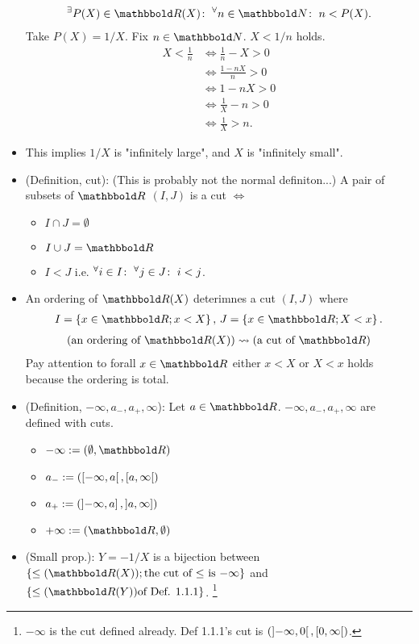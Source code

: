 \documentclass[9pt]{ltjsarticle}
\begin{document}
\begin{itemize}
  \begin{align}
    \Exists{P(X)\in \R (X)} \Forall{n\in \N} n < P(X).
  \end{align}
  \pf Take $P(X)=1/X$.  Fix $n\in \N$. $X<1/n$ holds.
  \begin{align}
    X < \frac{1}{n}
    &\iff
    \frac{1}{n}-X > 0 \\
    &\iff
    \frac{1-nX}{n}>0\\
    &\iff
    1-nX > 0\\
    &\iff
    \frac{1}{X}-n > 0\\
    &\iff
    \frac{1}{X} > n.
  \end{align}
  \item
  This implies $1/X$ is "infinitely large", and
  $X$ is "infinitely small".
  \item
  (Definition, cut):
  (This is probably not the normal definiton...)
  A pair of subsets of $\R$ $(I,J)$ is a cut $\iff$
  \begin{itemize}
    \item $I\cap J = \emptyset$
    \item $I\cup J = \R$
    \item $I < J$ i.e. ${}^{\forall}{i\in I}\mathrm{\colon\;}{}^{\forall}{j\in J}\mathrm{\colon\;} i < j$.
  \end{itemize}
  \item
  An ordering of $\R (X)$ deterimnes a cut $(I,J)$ where
  \begin{align}
    I=\set{x\in \R; x < X},\, J = \set{x\in \R; X < x}.
  \end{align}
  \begin{align}
    (\text{an ordering of $\R (X)$}) \squig
    (\text{a cut of $\R$})
  \end{align}
  Pay attention to forall $x\in \R$ either $x<X$ or $X<x$ holds because
  the ordering is total.
  \item
  (Definition, $-\infty,a_-,a_+,\infty$):
  Let $a\in \R$.
  $-\infty,a_-,a_+,\infty$ are defined with cuts.
  \begin{itemize}
    \item $-\infty \defeq \paren{\emptyset, \R}$
    \item $a_- := (\left[-\infty,a\right[,\left[a,\infty\right[)$
    \item $a_+ := (\left]-\infty,a\right], \left]a,\infty\right])$
    \item $+\infty \defeq (\R,\emptyset)$
  \end{itemize}
  \item
  (Small prop.):
  $Y=-1/X$ is a bijection between
  $\set{\le (\R (X)); \text{the cut of $\le$ is $-\infty$}}$
  and $\set{\le (\R (Y)) \text{of Def. 1.1.1} }$.
  \footnote{$-\infty$ is the cut defined already.
  Def 1.1.1's cut is $(\left] -\infty,0 \right[,\left[0,\infty\right[)$.}


\end{itemize}
\end{document}
